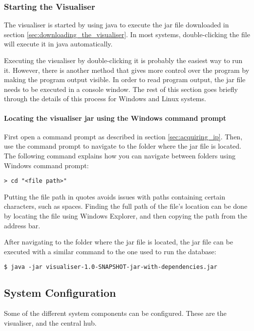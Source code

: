 \documentclass[../document.tex]{subfiles}
\begin{document}
\subsubsection{Starting the Visualiser}
The visualiser is started by using java to execute the jar file downloaded in section \ref{sec:downloading_the_visualiser}. In most systems, double-clicking the file will execute it in java automatically.

Executing the visualiser by double-clicking it is probably the easiest way to run it. However, there is another method that gives more control over the program by making the program output visible. In order to read program output, the jar file needs to be executed in a console window. The rest of this section goes briefly through the details of this process for Windows and Linux systems.

\paragraph{Locating the visualiser jar using the Windows command prompt}
First open a command prompt as described in section \ref{sec:acquiring_ip}. Then, use the command prompt to navigate to the folder where the jar file is located. The following command explains how you can navigate between folders using Windows command prompt:
\lstset{style=custombash}
\begin{lstlisting}[caption=Windows command to change current folder]
> cd "<file path>"
\end{lstlisting}
Putting the file path in quotes avoids issues with paths containing certain characters, such as spaces. Finding the full path of the file's location can be done by locating the file using Windows Explorer, and then copying the path from the address bar.

After navigating to the folder where the jar file is located, the jar file can be executed with a similar command to the one used to run the database:
\begin{lstlisting}[caption=Command to execute the visualiser in Java.]
$ java -jar visualiser-1.0-SNAPSHOT-jar-with-dependencies.jar
\end{lstlisting}



\subsection{System Configuration}
Some of the different system components can be configured. These are the visualiser, and the central hub.
\end{document}
